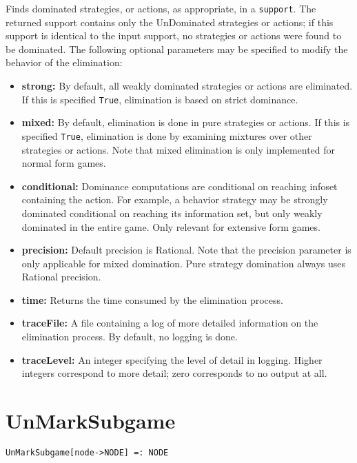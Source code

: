 \noindent
Finds dominated strategies, or actions, as appropriate, in a 
\verb+support+.  The returned support contains only the UnDominated
strategies or actions; if this support is identical to the input support,
no strategies or actions were found to be dominated.  The following
optional parameters may be specified to modify the behavior of
the elimination:

\begin{itemize}
\item \textbf{strong:} By default, all weakly dominated strategies or actions
are eliminated.  If this is specified \verb+True+, elimination is based
on strict dominance.
\item \textbf{mixed:} By default, elimination is done in pure strategies or
actions.  If this is specified \verb+True+, elimination is done by
examining mixtures over other strategies or actions.  Note that mixed 
elimination is only implemented for normal form games.  
\item \textbf{conditional:} Dominance computations are conditional on
reaching infoset containing the action.  For example, a behavior
strategy may be strongly dominated conditional on reaching its
information set, but only weakly dominated in the entire game.  Only
relevant for extensive form games.
\item \textbf{precision:} Default precision is Rational.  Note that the precision
parameter is only applicable for mixed domination.  Pure strategy
domination always uses Rational precision.
\item \textbf{time:} Returns the time consumed by the elimination process.
\item \textbf{traceFile:} A file containing a log of more detailed information
on the elimination process.  By default, no logging is done.
\item \textbf{traceLevel:} An integer specifying the level of detail in logging.
Higher integers correspond to more detail; zero corresponds to no output
at all.
\end{itemize}


\section*{UnMarkSubgame}\label{PrimUnMarkSubgame}
\begin{verbatim}
UnMarkSubgame[node->NODE] =: NODE 
\end{verbatim}

